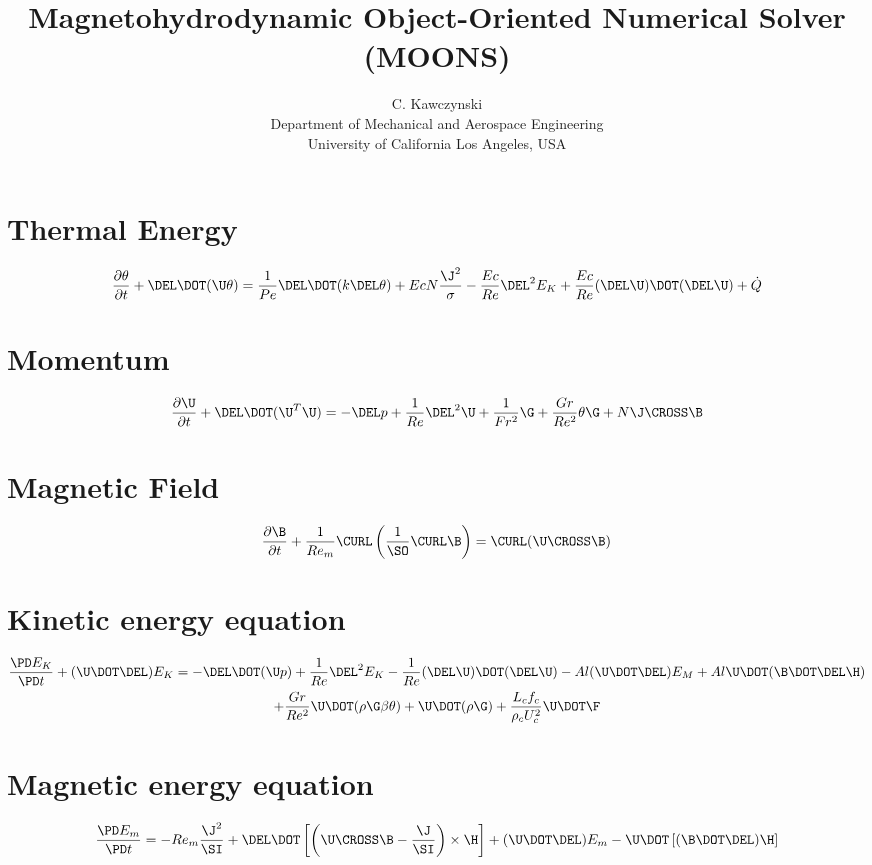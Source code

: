 \documentclass[11pt]{article}
\begin{document}
\doublespacing
\title{Magnetohydrodynamic Object-Oriented Numerical Solver (MOONS)}
\author{C. Kawczynski \\
Department of Mechanical and Aerospace Engineering \\
University of California Los Angeles, USA\\}

\section{Thermal Energy}
\Large
\begin{equation}
	\frac{\partial \theta}{\partial t}
	+ \DEL \DOT (\U \theta)
	=
	\frac{1}{Pe} \DEL \DOT (k \DEL \theta)
	+ Ec N \frac{{\J}^2}{\sigma}
	- \frac{Ec}{Re} \DEL^2 E_K
	+ \frac{Ec}{Re} (\DEL \U) \DOT (\DEL \U)
	+ \dot{Q}
\end{equation}
\section{Momentum}
\begin{equation}
	\frac{\partial \U}{\partial t}
	+ \DEL \DOT (\U^T \U)
	=
	- \DEL p
	+ \frac{1}{Re} \DEL^2 \U
	+ \frac{1}{Fr^2} \G
	+ \frac{Gr}{Re^2} \theta \G
	+ N \J \CROSS \B
\end{equation}
\section{Magnetic Field}
\begin{equation}
	\frac{\partial \B}{\partial t}
	+ \frac{1}{Re_m} \CURL \left(\frac{1}{\SO} \CURL \B \right)
	= \CURL (\U \CROSS \B)
\end{equation}
\section{Kinetic energy equation}
\begin{multline}
	\frac{\PD E_K}{\PD t}
	+ (\U \DOT \DEL) E_K
	=
	- \DEL \DOT (\U p)
	+ \frac{1}{Re} \DEL^2 E_K
	- \frac{1}{Re} (\DEL \U) \DOT (\DEL \U)
	- Al (\U \DOT \DEL) E_M
	+ Al \U \DOT (\B \DOT \DEL \H) \\
	+ \frac{Gr}{Re^2} \U \DOT (\rho \G \beta \theta)
	+ \U \DOT (\rho \G)
	+ \frac{L_c f_c}{\rho_c U_c^2} \U \DOT \F
\end{multline}
\section{Magnetic energy equation}
\begin{equation}
	\frac{\PD E_m}{\PD t} =
	- Re_m \frac{{\J}^2}{\SI}
	+ \DEL \DOT \left[\left(\U \CROSS \B - \frac{\J}{\SI} \right) \times \H \right]
	+ (\U \DOT \DEL) E_m
	- \U \DOT \left[(\B \DOT \DEL) \H \right]
\end{equation}
\end{document}
